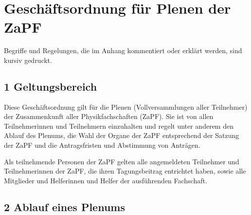 

\section{Geschäftsordnung für Plenen der ZaPF}
\label{sec:go}

Begriffe und Regelungen, die im Anhang kommentiert oder erklärt werden, sind
kursiv gedruckt.


\subsection*{1 Geltungsbereich%
  \label{geltungsbereich}%
}

Diese Geschäftsordnung gilt für die Plenen (Vollversammlungen aller Teilnehmer)
der Zusammenkunft aller Physikfachschaften (ZaPF).
Sie ist von allen Teilnehmerinnen und Teilnehmern einzuhalten und regelt unter
anderem den Ablauf des Plenums, die Wahl der Organe der ZaPF entsprechend der
Satzung der ZaPF und die Antragsfristen und Abstimmung von Anträgen.

Als teilnehmende Personen der ZaPF gelten alle angemeldeten Teilnehmer und
Teilnehmerinnen der ZaPF, die ihren Tagungsbeitrag entrichtet haben, sowie alle
Mitglieder und Helferinnen und Helfer der ausführenden Fachschaft.


\subsection*{2 Ablauf eines Plenums%
  \label{ablauf-eines-plenums}%
}

